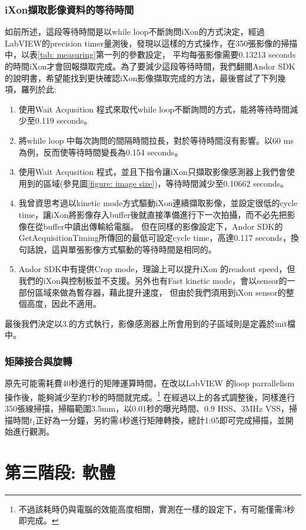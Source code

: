 \documentclass[12pt]{article}
\begin{document}
    \subsubsection{iXon擷取影像資料的等待時間}
    如前所述，這段等待時間是以while loop不斷詢問iXon的方式決定，經過LabVIEW的precision timer量測後，發現以這樣的方式操作，在350張影像的掃描中，以表\ref{tab: measuring}第一列的參數設定，
    平均每張影像需要0.13213 seconds的時間iXon才會回報擷取完成。為了要減少這段等待時間，我們翻閱Andor SDK的說明書，希望能找到更快確認iXon影像擷取完成的方法，最後嘗試了下列幾項，羅列於此:
    \begin{enumerate}
        \item 使用Wait Acqusition 程式來取代while loop不斷詢問的方式，能將等待時間減少至0.119 seconds。
        \item 將while loop 中每次詢問的間隔時間拉長，對於等待時間沒有影響。以60 ms為例，反而使等待時間變長為0.154 seconds。
        \item 使用Wait Acqusition 程式，並且下指令讓iXon只擷取影像感測器上我們會使用到的區域(參見圖\ref{figure: image size})，等待時間減少至0.10662 seconds。
        \item 我曾資思考過以kinetic mode方式驅動iXon連續擷取影像，並設定很低的cycle time，讓iXon將影像存入buffer後就直接準備進行下一次拍攝，而不必先把影像在從buffer中讀出傳輸給電腦。
        但在同樣的影像設定下，Andor SDK的GetAcquisitionTiming所傳回的最低可設定cycle time，高達0.117 seconds，換句話說，這與單張影像方式驅動的等待時間是相同的。
        \item Andor SDK中有提供Crop mode，理論上可以提升iXon 的readout speed，但我們的iXon與控制板並不支援。另外也有Fast kinetic mode，會以sensor的一部份區域來做為暫存器，藉此提升速度，
        但由於我們須用到iXon sensor的整個高度，因此不適用。
    \end{enumerate}
    最後我們決定以3.的方式執行，影像感測器上所會用到的子區域則是定義於init檔中。
    \subsubsection{矩陣接合與旋轉}
    原先可能需耗費40秒進行的矩陣運算時間，在改以LabVIEW 的loop parrallelism操作後，能夠減少至約7秒的時間就完成。\footnote{不過該耗時仍與電腦的效能高度相關，實測在一樣的設定下，有可能僅需3秒即完成。}
    在經過以上的各式調整後，同樣進行350張線掃描，掃瞄範圍3.5mm，以0.01秒的曝光時間、0.9 HSS、3MHz VSS，掃描時間$t_1$正好為一分鐘，另約需4秒進行矩陣轉換，總計1:05即可完成掃描，並開始進行觀測。

    \section{第三階段: 軟體}
\end{document}

